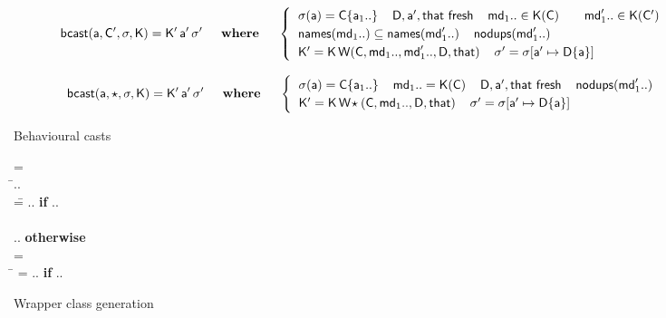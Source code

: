\documentclass[acmlarge, anonymous, authordraft]{acmart}
\begin{document}
\begin{figure}[!b]
\hrulefill
\small

\vspace{-4mm}

\begin{equation*}
  \behcastE\a\Cp\s\K \Kp\ap\sp \HS\HS\WHERE\HS\HS \begin{cases}
\HS  \App\s\a = \obj\C{\a_1..} \HS\HS
  \fresh{\D,\ap,\that} \HS\HS
  \mds 1.. \In \App\K\C \qquad \mdps 1.. \In \App\K\Cp \\\HS
  \names{\mds 1..} \subseteq \names{\mdps 1..} \HS\HS \cload{\mdps 1..} \\\HS
  \Kp = \K\,\wrap\C{\mds 1..}{\mdps 1..}\D\that \HS\HS
  \sp = \Map \s{\Bind\ap{\obj\D{\a}}} 
  \end{cases}
\end{equation*}

\begin{equation*}
  \behcastE\a\any\s\K \Kp\ap\sp  \HS\HS\WHERE\HS\HS\begin{cases}\HS
  \App\s\a = \obj\C{\a_1..} \HS\HS \mds 1.. = \App\K\C \HS\HS
  \fresh{\D,\ap,\that} \HS\HS \cload{\mdps 1..} \\\HS
  \Kp = \K\,\wrapAny\C{\mds 1..}\D\that \HS\HS
  \sp = \Map \s{\Bind\ap{\obj\D{\a}}} 
\end{cases}\end{equation*}


\hrulefill
\vspace{-2mm}\caption{Behavioural casts}\label{behavetext}

\hrulefill
\small

\begin{tabbing}\small
  \wrap{}\D\that = \\
  \HS\HS\WHERE\HS\= \Mdef\m{}\e\In{}.. \\
                 \>  =\=  ..
    \HS \= \textbf{if} \HS \Mdef\m{}\ep\In{}.. \\
\\[-3mm]
\> \>   ..  \>\textbf{otherwise}
\\[3mm]
   = \\
\HS\HS\WHERE\HS\= = \src{ \Mdef\m\x{\any}{\any}{~\BehCast\any{ \KCall{\FRead\that} \m {\bscast{\t}\x}{\t}{\tp}} } }   ..
    \HS\HS\HS\HS \= \textbf{if} \HS \Mdef\m\x{\t}{\tp}\e\In{}.. \\
\end{tabbing}

\vspace{-5mm}

\hrulefill
\vspace{-2mm}
\caption{Wrapper class generation}\label{w}\end{figure}
\end{document}
